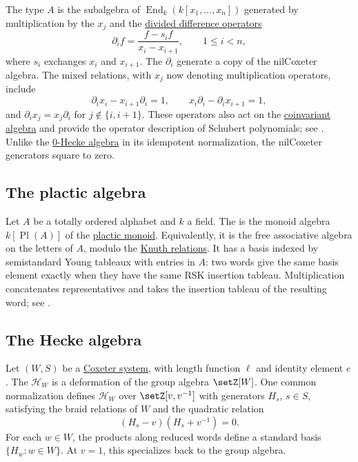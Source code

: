 The type $A$ \label{nilHeckeAlgebra} is the
subalgebra of $\operatorname{End}_k(k[x_1,\dotsc,x_n])$ generated by
multiplication by the $x_j$ and the
\hyperref[dividedDifferenceOperators]{divided difference operators}
\[
 \partial_i f=\frac{f-s_i f}{x_i-x_{i+1}},
 \qquad 1\leq i<n,
\]
where $s_i$ exchanges $x_i$ and $x_{i+1}$.
The $\partial_i$ generate a copy of the nilCoxeter algebra. The mixed
relations, with $x_j$ now denoting multiplication operators, include
\[
 \partial_i x_i-x_{i+1}\partial_i=1,
 \qquad x_i\partial_i-\partial_i x_{i+1}=1,
\]
and $\partial_i x_j=x_j\partial_i$ for $j\notin\{i,i+1\}$.
These operators also act on the \hyperref[coinvariantAlgebra]{coinvariant
algebra} and provide the operator description of Schubert polynomials;
see \cite{KostantKumar1986NilHecke}.
Unlike the \hyperref[zeroHeckeAlgebra]{0-Hecke algebra} in its idempotent
normalization, the nilCoxeter generators square to zero.

\subsection[placticAlgebra]{The plactic algebra}

Let $A$ be a totally ordered alphabet and $k$ a field.
The  is the monoid algebra
$k[\operatorname{Pl}(A)]$ of the
\hyperref[placticMonoid]{plactic monoid}. Equivalently, it is the free
associative algebra on the letters of $A$, modulo the
\hyperref[knuthRelations]{Knuth relations}.
It has a basis indexed by semistandard Young tableaux with entries in $A$:
two words give the same basis element exactly when they have the same
RSK insertion tableau. Multiplication concatenates representatives and
takes the insertion tableau of the resulting word; see
\cite[Ch.~2]{Fulton1997}.

\subsection[heckeAlgebra]{The Hecke algebra}

Let $(W,S)$ be a \hyperref[coxeterGroups]{Coxeter system}, with length
function $\ell$ and identity element $e$.  The 
$\mathcal{H}_W$ is a deformation of the group algebra $\setZ[W]$.  One
common normalization defines $\mathcal{H}_W$ over $\setZ[v,v^{-1}]$ with
generators $H_s$, $s\in S$, satisfying the braid relations of $W$ and the
quadratic relation
\[
  (H_s-v)(H_s+v^{-1})=0.
\]
For each $w\in W$, the products along reduced words define a standard basis
$\{H_w : w\in W\}$.  At $v=1$, this specializes back to the group algebra.

